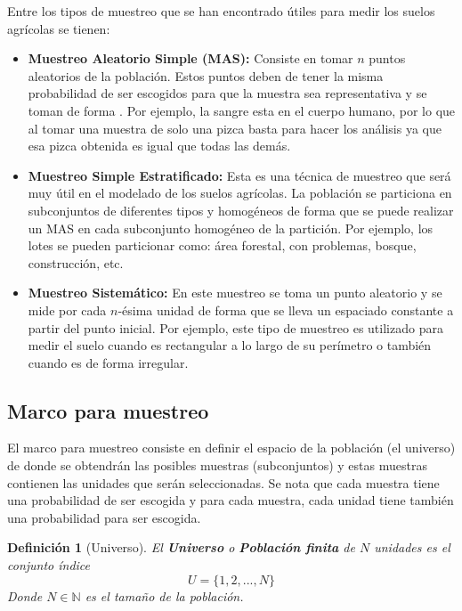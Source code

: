 \documentclass{report}
\newtheorem{definition}{Definición}
\begin{document}
\bigbreak

Entre los tipos de muestreo que se han encontrado útiles para medir los suelos agrícolas se tienen:

\begin{itemize}
    \item \textbf{Muestreo Aleatorio Simple (MAS):} Consiste en tomar $n$ puntos aleatorios de la población. Estos puntos deben de tener la misma probabilidad de ser escogidos para que la muestra sea representativa y se toman de forma . Por ejemplo, la sangre esta  en el cuerpo humano, por lo que al tomar una muestra de solo una pizca basta para hacer los análisis ya que esa pizca obtenida es igual que todas las demás.
    
    \item \textbf{Muestreo Simple Estratificado:} Esta es una técnica de muestreo que será muy útil en el modelado de los suelos agrícolas. La población se particiona en subconjuntos de diferentes tipos y homogéneos de forma que se puede realizar un MAS en cada subconjunto homogéneo de la partición. Por ejemplo, los lotes se pueden particionar como: área forestal, con problemas, bosque, construcción, etc.
    
    \item \textbf{Muestreo Sistemático:} En este muestreo se toma un punto aleatorio y se mide por cada $n$-ésima unidad de forma que se lleva un espaciado constante a partir del punto inicial. Por ejemplo, este tipo de muestreo es utilizado para medir el suelo cuando es rectangular a lo largo de su perímetro o también cuando es de forma irregular.
\end{itemize}

\subsection{Marco para muestreo}

El marco para muestreo \cite{lohr-2009} consiste en definir el espacio de la población (el universo) de donde se obtendrán las posibles muestras (subconjuntos) y estas muestras contienen las unidades que serán seleccionadas. Se nota que cada muestra tiene una probabilidad de ser escogida y para cada muestra, cada unidad tiene también una probabilidad para ser escogida.

\begin{definition}[Universo]
    El \textbf{Universo} o \textbf{Población finita} de $N$ unidades es el conjunto índice
    $$
    U = \{ 1, 2, ..., N \}
    $$
    Donde $N \in \mathbb{N}$ es el tamaño de la población.
\end{definition}
\end{document}
